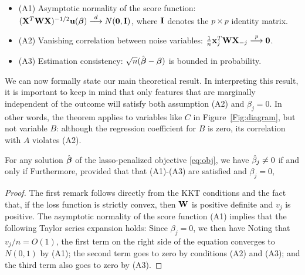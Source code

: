 \begin{itemize}
\item (A1) Asymptotic normality of the score function: $(\mathbf{X}^T\mathbf{W}\mathbf{X})^{-1/2}\mathbf{u}(\boldsymbol{\beta}) \overset{d}{\longrightarrow} N(\mathbf{0},  \mathbf{I})$, where $\mathbf{I}$ denotes the $p \times p$ identity matrix.
\item (A2) Vanishing correlation between noise variables: $\frac{1}{n}\mathbf{x}_j^T\mathbf{W}\mathbf{X}_{-j} \overset{p}{\longrightarrow} \mathbf{0}$.
\item (A3) Estimation consistency: $\sqrt{n}(\hat{\boldsymbol{\beta}}-  \boldsymbol{\beta})$ is bounded in probability.
\end{itemize}

We can now formally state our main theoretical result.  In interpreting this result, it is important to keep in mind that only features that are marginally independent of the outcome will satisfy both assumption (A2) and $\beta_j=0$.
In other words, the theorem applies to variables like $C$ in Figure~\ref{Fig:diagram}, but not variable $B$: although the regression coefficient for $B$ is zero, its correlation with $A$ violates (A2).

\begin{theorem}
  \label{Thm:main}
  For any solution $\hat{\boldsymbol{\beta}}$ of the lasso-penalized objective \eqref{eq:obj}, we have $\hat{\beta}_j \neq 0$ if and only if
  Furthermore, provided that that (A1)-(A3) are satisfied and $\beta_j=0$,
\end{theorem}


\begin{proof}
  The first remark follows directly from the KKT conditions and the fact that, if the loss function is strictly convex, then $\mathbf{W}$ is positive definite and $v_j$ is positive.  The asymptotic normality of the score function (A1) implies that the following Taylor series expansion holds:
Since $\beta_j=0$, we then have
Noting that $v_j/n=O(1)$, the first term on the right side of the equation converges to $N(0,1)$ by (A1); the second term goes to zero by conditions (A2) and (A3); and the third term also goes to zero by (A3).
\end{proof}

